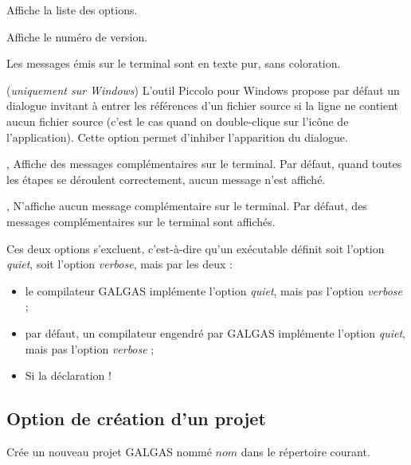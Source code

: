  Affiche la liste des options.

 Affiche le numéro de version.

 Les messages émis sur le terminal sont en texte pur, sans coloration.

 (\emph{uniquement sur Windows}) L’outil Piccolo pour Windows propose par défaut un dialogue invitant à entrer les références d’un fichier source si la ligne ne contient aucun fichier source (c’est le cas quand on double-clique sur l’icône de l’application). Cette option permet d'inhiber l’apparition du dialogue.




,  Affiche des messages complémentaires sur le terminal. Par défaut, quand toutes les étapes se déroulent correctement, aucun message n’est affiché.

,  N'affiche aucun message complémentaire sur le terminal. Par défaut, des messages complémentaires sur le terminal sont affichés.

Ces deux options s'excluent, c'est-à-dire qu'un exécutable définit soit l'option \emph{quiet}, soit l'option \emph{verbose}, mais par les deux :
\begin{itemize}
  \item le compilateur GALGAS implémente l'option \emph{quiet}, mais pas l'option \emph{verbose} ;
  \item par défaut, un compilateur engendré par GALGAS implémente l'option \emph{quiet}, mais pas l'option \emph{verbose} ;
  \item Si la déclaration \ggs!%
\end{itemize}





\subsection{Option de création d'un projet}


 Crée un nouveau projet GALGAS nommé $nom$ dans le répertoire courant.





